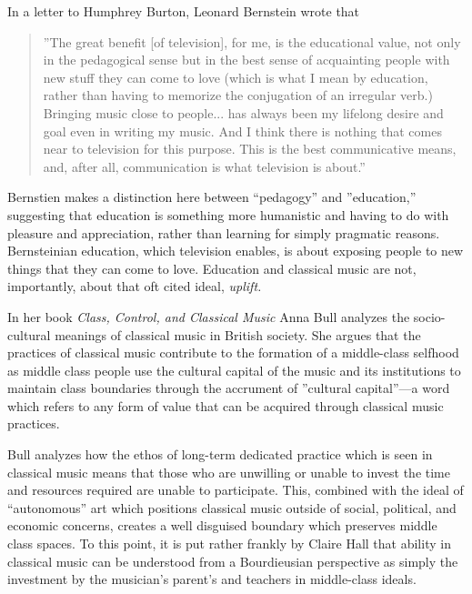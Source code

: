 \documentclass[12pt,letterpaper]{article}
\begin{document}
	In a letter to Humphrey Burton, Leonard Bernstein wrote that 

	\begin{quote}
	''The great
	benefit [of television], for me, is the educational value, not only in 
	the pedagogical sense but in the best sense of acquainting people with 
	new stuff they can come to love (which is what I mean by education, 
	rather than having to memorize the conjugation of an irregular verb.) 
	Bringing music close to people... has always been my lifelong desire and
	goal even in writing my music. And I think there is nothing that comes 
	near to television for this purpose. This is the best communicative 
	means, and, after all, communication is what television is 
	about.''\autocite[71]{Kopfstein}
	\end{quote}

	Bernstien makes a distinction here between ``pedagogy'' and 
	''education,'' suggesting that education is something more humanistic 
	and having to do with pleasure and appreciation, rather than learning 
	for simply pragmatic reasons. Bernsteinian education, which television 
	enables, is about exposing people to new things that they can come to 
	love. Education and classical music are not, importantly, about 
	that oft cited ideal, \textit{uplift.} 

	In her book \textit{Class, Control, and Classical Music} Anna Bull 
	analyzes the socio-cultural meanings of classical music in British
	society. She argues that the practices of classical music contribute to
	the formation of a middle-class selfhood as middle class people use the
	cultural capital of the music and its institutions to maintain class
	boundaries through the accrument of ''cultural capital''---a word which
	refers to any form of value that can be acquired through classical music 
	practices.\autocite[4]{Bull}\autocite[3]{Bull}

	Bull analyzes how the ethos of long-term dedicated practice which is 
	seen in classical music means that those who are unwilling or unable to
	invest the time and resources required are unable to participate.
	This, combined with the ideal of ``autonomous'' art which 
	positions classical music outside of social, political, and economic 
	concerns, creates a well disguised boundary which preserves middle 
	class spaces.\autocite[6]{Bull} To this point, it is put rather frankly
	 by Claire Hall that ability in classical music can be 
	understood from a Bourdieusian perspective as simply the investment by 
	the musician's parent's and teachers in middle-class 
	ideals.\autocite[7]{Bull}
\end{document}
